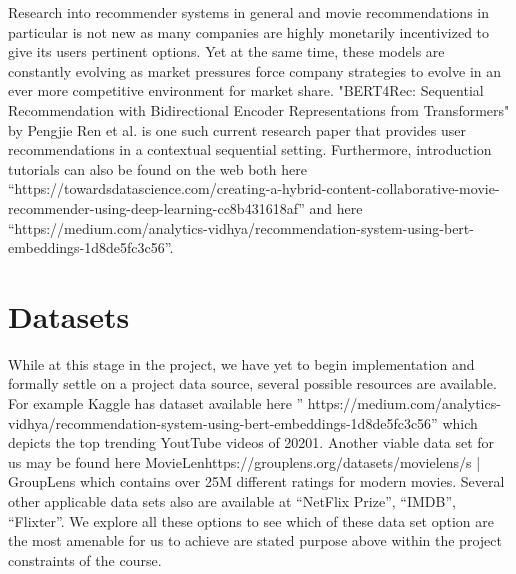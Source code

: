 \documentclass[10pt,twocolumn,letterpaper]{article}
\begin{document}
Research into recommender systems in general and movie recommendations in particular is not new as many companies are highly monetarily incentivized to give its users pertinent options.  Yet at the same time, these models are constantly evolving as market pressures force company strategies to evolve in an ever more competitive environment for market share. "BERT4Rec: Sequential Recommendation with Bidirectional Encoder Representations from Transformers" by Pengjie Ren et al. is one such current research paper that provides user recommendations in a contextual sequential setting.  Furthermore, introduction tutorials can also be found on the web both here “https://towardsdatascience.com/creating-a-hybrid-content-collaborative-movie-recommender-using-deep-learning-cc8b431618af” and here “https://medium.com/analytics-vidhya/recommendation-system-using-bert-embeddings-1d8de5fc3c56”.


\section{Datasets}

While at this stage in the project, we have yet to begin implementation and formally settle on a project data source, several possible resources are available.  For example Kaggle has dataset available here ” https://medium.com/analytics-vidhya/recommendation-system-using-bert-embeddings-1d8de5fc3c56” which depicts the top trending YoutTube videos of 20201.  Another viable data set for us may be found here MovieLenhttps://grouplens.org/datasets/movielens/s | GroupLens which contains over 25M different ratings for modern movies.  Several other applicable data sets also are available at “NetFlix Prize”, “IMDB”, “Flixter”.  We explore all these options to see which of these data set option are the most amenable for us to achieve are stated purpose above within the project constraints of the course.
\end{document}
